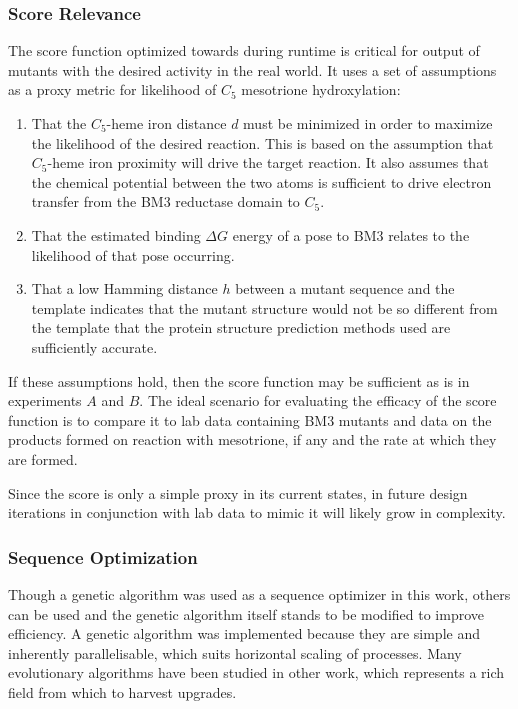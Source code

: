 \documentclass[16pt]{article}
\begin{document}
\subsubsection{Score Relevance}
 The score function optimized towards during runtime is critical for output of mutants with the desired activity in the real world.
 It uses a set of assumptions as a proxy metric for likelihood of $C_5$ mesotrione hydroxylation:
 \begin{enumerate}
	\item That the $C_5$-heme iron distance $d$ must be minimized in order to maximize the likelihood of the desired reaction.
	      This is based on the assumption that $C_5$-heme iron proximity will drive the target reaction.
	      It also assumes that the chemical potential between the two atoms is sufficient to drive electron transfer from the BM3 reductase domain to $C_5$.
	\item That the estimated binding $\Delta G$ energy of a pose to BM3 relates to the likelihood of that pose occurring. 
	\item That a low Hamming distance $h$ between a mutant sequence and the template indicates that the mutant structure would not be so different from the template that the protein structure prediction methods used are sufficiently accurate.
 \end{enumerate}

If these assumptions hold, then the score function may be sufficient as is in experiments $A$ and $B$.
The ideal scenario for evaluating the efficacy of the score function is to compare it to lab data containing BM3 mutants and data on the products formed on reaction with mesotrione, if any and the rate at which they are formed.

Since the score is only a simple proxy in its current states, in future design iterations in conjunction with lab data to mimic it will likely grow in complexity.

\subsubsection{Sequence Optimization}

Though a genetic algorithm was used as a sequence optimizer in this work, others can be used and the genetic algorithm itself stands to be modified to improve efficiency.
A genetic algorithm was implemented because they are simple and inherently parallelisable, which suits horizontal scaling of processes.
Many evolutionary algorithms have been studied in other work, which represents a rich field from which to harvest upgrades.
\end{document}
